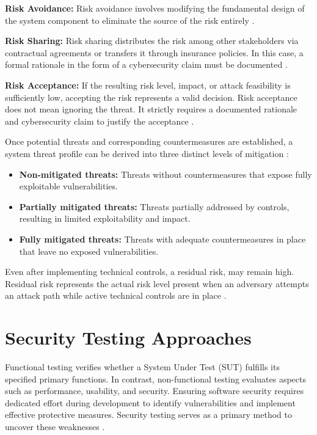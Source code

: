 		\textbf{Risk Avoidance:} Risk avoidance involves modifying the fundamental design of the system component to eliminate the source of the risk entirely \cite[p. 200]{doCarmo2025}.
		
		\textbf{Risk Sharing:} Risk sharing distributes the risk among other stakeholders via contractual agreements or transfers it through insurance policies. In this case, a formal rationale in the form of a cybersecurity claim must be documented \cite[p. 201]{doCarmo2025}.
		
		\textbf{Risk Acceptance:} If the resulting risk level, impact, or attack feasibility is sufficiently low, accepting the risk represents a valid decision. Risk acceptance does not mean ignoring the threat. It strictly requires a documented rationale and cybersecurity claim to justify the acceptance \cite[p. 201]{doCarmo2025}.
		
Once potential threats and corresponding countermeasures are established, a system threat profile can be derived into three distinct levels of mitigation \cite{owasp_threat_modeling_process}:
	\begin{itemize}
		\item \textbf{Non-mitigated threats:} Threats without countermeasures that expose fully exploitable vulnerabilities.
		\item \textbf{Partially mitigated threats:} Threats partially addressed by controls, resulting in limited exploitability and impact.
		\item \textbf{Fully mitigated threats:} Threats with adequate countermeasures in place that leave no exposed vulnerabilities.
	\end{itemize}
		
Even after implementing technical controls, a residual risk, may remain high. Residual risk represents the actual risk level present when an adversary attempts an attack path while active technical controls are in place \cite[pp. 200]{doCarmo2025}.






\section{Security Testing Approaches}
\label{sec:security_testing_approaches}

Functional testing verifies whether a System Under Test (SUT) fulfills its specified primary functions. In contrast, non-functional testing evaluates aspects such as performance, usability, and security. Ensuring software security requires dedicated effort during development to identify vulnerabilities and implement effective protective measures. Security testing serves as a primary method to uncover these weaknesses \cite[p. 291]{tauqeer2021analysis}.

